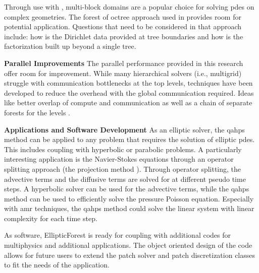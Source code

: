 Through use with \pforest, multi-block domains are a popular choice for solving \gls{pdes} on complex geometries. The forest of octree approach used in \pforest provides room for potential application. Questions that need to be considered in that approach include: how is the Dirichlet data provided at tree boundaries and how is the factorization built up beyond a single tree.

{\bf Parallel Improvements}
The parallel performance provided in this research offer room for improvement. While many hierarchical solvers (i.e., multigrid) struggle with communication bottlenecks at the top levels, techniques have been developed to reduce the overhead with the global communication required. Ideas like better overlap of compute and communication as well as a chain of separate forests for the levels \citep{bangerth2012algorithms}.

{\bf Applications and Software Development}
As an elliptic solver, the \gls{qahps} method can be applied to any problem that requires the solution of elliptic \gls{pdes}. This includes coupling with hyperbolic or parabolic problems. A particularly interesting application is the Navier-Stokes equations through an operator splitting approach (the projection method \citep{chorin1967numerical}). Through operator splitting, the advective terms and the diffusive terms are solved for at different pseudo time steps. A hyperbolic solver can be used for the advective terms, while the \gls{qahps} method can be used to efficiently solve the pressure Poisson equation. Especially with \gls{amr} techniques, the \gls{qahps} method could solve the linear system with linear complexity for each time step.

As software, EllipticForest \citep{chipman2024ellipticforest} is ready for coupling with additional codes for multiphysics and additional applications. The object oriented design of the code allows for future users to extend the patch solver and patch discretization classes to fit the needs of the application.